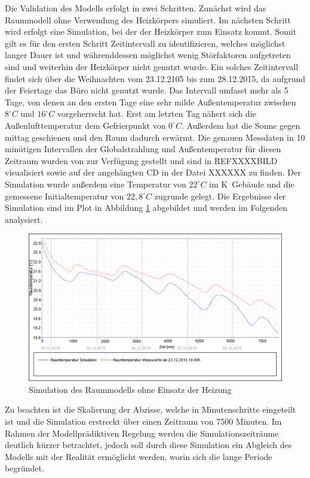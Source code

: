 Die Validation des Modells erfolgt in zwei Schritten. Zunächst wird das Raummodell ohne Verwendung des Heizkörpers simuliert. Im nächsten Schritt wird erfolgt eine Simulation, bei der der Heizkörper zum Einsatz kommt.
Somit gilt es für den ersten Schritt Zeitintervall zu identifizieren, welches möglichst langer Dauer ist und währenddessen möglichst wenig Störfaktoren aufgetreten sind und weiterhin der Heizkörper nicht genutzt wurde. Ein solches Zeitintervall findet sich über die Weihnachten vom 23.12.2105 bis zum 28.12.2015, da aufgrund der Feiertage das Büro nicht genutzt wurde.
Das Intervall umfasst mehr als 5 Tage, von denen an den ersten Tage eine sehr milde Außentemperatur zwischen $8^{\circ}C$ und $16^{\circ}C$ vorgeherrscht hat. Erst am letzten Tag nähert sich die Außenlufttemperatur dem Gefrierpunkt von $0^{\circ}C$. Außerdem hat die Sonne gegen mittag geschienen und den Raum dadurch erwärmt.
Die genauen Messdaten in 10 minütigen Intervallen der Globalstrahlung und Außentemperatur für diesen Zeitraum wurden von \cite{wetter} zur Verfügung gestellt und sind in REFXXXXBILD visualisiert sowie auf der angehängten CD in der Datei XXXXXX zu finden.
Der Simulation wurde außerdem eine Temperatur von $22^{\circ}C$ im K~Gebäude und die gemessene Initialtemperatur von $22,8^{\circ}C$ zugrunde gelegt. Die Ergebnisse der Simulation sind im Plot in Abbildung \ref{fig:valid1} abgebildet und werden im Folgenden analysiert.

\begin{figure}
\centering
\includegraphics[width=\textwidth]{abbildungen/20160328_validierung1}
\caption{Simulation des Raummodells ohne Einsatz der Heizung}
\label{fig:valid1}
\end{figure}

Zu beachten ist die Skalierung der Abzisse, welche in Minutenschritte eingeteilt ist und die Simulation erstreckt über einen Zeitraum von 7500 Minuten. Im Rahmen der Modellprädiktiven Regelung werden die Simulationszeiträume deutlich kürzer betrachtet, jedoch soll durch diese Simulation ein Abgleich des Modells mit der Realität ermöglicht werden, worin sich die lange Periode begründet.

